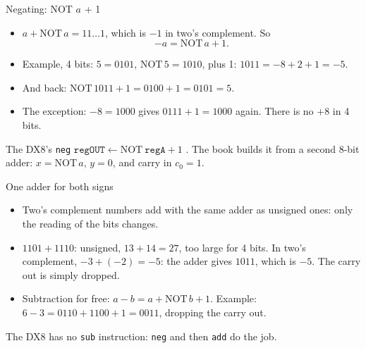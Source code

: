 \documentclass[10pt]{wosm-slides}
\begin{document}
\begin{frame}{Negating: NOT $a$ + 1}
  \begin{itemize}
    \item $a + \mathrm{NOT}\,a = 11\ldots1$, which is $-1$ in two's complement. So
      \[ -a = \mathrm{NOT}\,a + 1. \]
    \item Example, 4 bits: $5 = 0101$, $\mathrm{NOT}\,5 = 1010$, plus 1:
      $1011 = -8 + 2 + 1 = -5$.
    \item And back: $\mathrm{NOT}\,1011 + 1 = 0100 + 1 = 0101 = 5$.
    \item The exception: $-8 = 1000$ gives $0111 + 1 = 1000$ again. There is no $+8$
      in 4 bits.
  \end{itemize}

  \begin{block}{The DX8's \texttt{neg}}
    $\texttt{regOUT} \leftarrow \mathrm{NOT}\ \texttt{regA} + 1$ . The book
    builds it from a second 8-bit adder: $x = \mathrm{NOT}\,a$, $y = 0$, and carry in
    $c_0 = 1$.
  \end{block}
\end{frame}

\begin{frame}{One adder for both signs}
  \begin{itemize}
    \item Two's complement numbers add with the \alert{same} adder as unsigned ones:
      only the reading of the bits changes.
    \item $1101 + 1110$: unsigned, $13 + 14 = 27$, too large for 4 bits. In two's
      complement, $-3 + (-2) = -5$: the adder gives $1011$, which is $-5$. The carry
      out is simply dropped.
    \item Subtraction for free: $a - b = a + \mathrm{NOT}\,b + 1$. Example:
      $6 - 3 = 0110 + 1100 + 1 = 0011$, dropping the carry out.
  \end{itemize}

  \begin{remark}
    The DX8 has no \texttt{sub} instruction: \texttt{neg} and then \texttt{add} do the
    job.
  \end{remark}
\end{frame}
\end{document}
